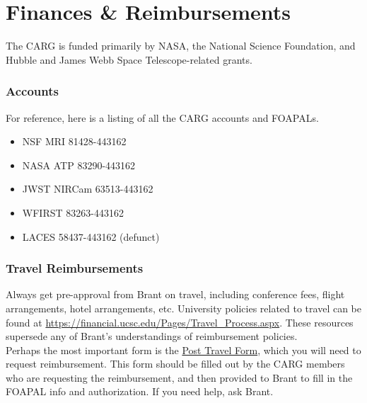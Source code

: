 \section{Finances \& Reimbursements}
\label{sec:finances}

The CARG is funded primarily by
NASA,
the National Science Foundation,
and Hubble and James Webb Space
Telescope-related grants. 

\subsubsection{Accounts}
For reference, here is a listing of all the CARG accounts and FOAPALs.
\begin{itemize}
\item NSF MRI 81428-443162
\item NASA ATP 83290-443162
\item JWST NIRCam 63513-443162
\item WFIRST 83263-443162
\item LACES 58437-443162 (defunct)
\end{itemize}

\subsubsection{Travel Reimbursements}

Always get pre-approval from 
Brant on travel,
including conference fees,
flight arrangements, 
hotel arrangements, etc. 
University policies related to
travel can be found at \href{https://financial.ucsc.edu/Pages/Travel_Process.aspx}{https://financial.ucsc.edu/Pages/Travel\_Process.aspx}. These resources
supersede any of Brant's 
understandings of reimbursement
policies.\\

\noindent
Perhaps the most important form is the 
\href{https://financial.ucsc.edu/Financial_Affairs_Forms/Post_Travel_Expense.pdf}{Post Travel Form}, which
you will need to request reimbursement.
This form should be filled out by
the CARG members who are 
requesting the reimbursement, and
then provided to Brant to fill in
the FOAPAL info and authorization.
If you need help, ask Brant.
